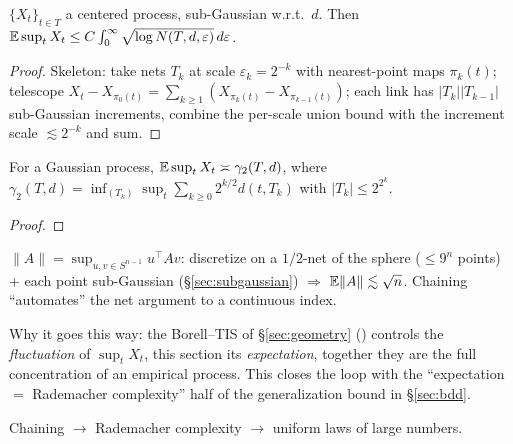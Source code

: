 
\begin{theorem}\label{thm:dudley}
$\{X_t\}_{t\in T}$ a centered process, sub-Gaussian w.r.t.\ $d$. Then
$\mathbb E\sup_{t}X_t\le C\int_0^{\infty}\sqrt{\log N(T,d,\varepsilon)}\,d\varepsilon$.
\end{theorem}
\begin{proof}
Skeleton: take nets $T_k$ at scale $\varepsilon_k=2^{-k}$ with nearest-point maps $\pi_k(t)$; telescope
$X_t-X_{\pi_0(t)}=\sum_{k\ge1}(X_{\pi_k(t)}-X_{\pi_{k-1}(t)})$; each link has $|T_k||T_{k-1}|$ sub-Gaussian increments,
combine the per-scale union bound with the increment scale $\lesssim 2^{-k}$ and sum.
\end{proof}

\begin{theorem}\label{thm:generic-chaining}
For a Gaussian process, $\mathbb E\sup_t X_t\asymp\gamma_2(T,d)$, where
$\gamma_2(T,d)=\inf_{(T_k)}\sup_t\sum_{k\ge0}2^{k/2}d(t,T_k)$ with $|T_k|\le 2^{2^k}$.
\end{theorem}
\begin{proof}\end{proof}

\begin{example}\label{ex:operator-norm}
$\|A\|=\sup_{u,v\in S^{n-1}}u^\top Av$: discretize on a $1/2$-net of the sphere ($\le 9^n$ points) + each point sub-Gaussian
(§\ref{sec:subgaussian}) $\Rightarrow$ $\mathbb E\|A\|\lesssim\sqrt n$. Chaining ``automates'' the net argument to a continuous index.
\end{example}

\begin{strand}
Why it goes this way: the Borell–TIS of §\ref{sec:geometry} () controls the \emph{fluctuation} of $\sup_t X_t$,
this section its \emph{expectation}, together they are the full concentration of an empirical process. This closes the loop
with the ``expectation $=$ Rademacher complexity'' half of the generalization bound in §\ref{sec:bdd}.
\end{strand}

%
 Chaining $\to$ Rademacher complexity $\to$ uniform laws of large numbers.
